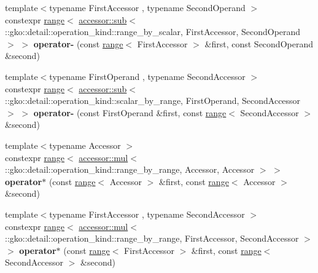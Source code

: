 \begin{DoxyCompactItemize}
\item 
\mbox{\label{namespacegko_a4d778fb0a4dd79be3297adea7a8b4e31}} 
{\footnotesize template$<$typename First\+Accessor , typename Second\+Operand $>$ }\\constexpr \hyperlink{classgko_1_1range}{range}$<$ \hyperlink{structgko_1_1accessor_1_1sub}{accessor\+::sub}$<$ \+::gko\+::detail\+::operation\+\_\+kind\+::range\+\_\+by\+\_\+scalar, First\+Accessor, Second\+Operand $>$ $>$ {\bfseries operator-\/} (const \hyperlink{classgko_1_1range}{range}$<$ First\+Accessor $>$ \&first, const Second\+Operand \&second)
\item 
\mbox{\label{namespacegko_a5d0e9697a7f202cdfef1016e535e2568}} 
{\footnotesize template$<$typename First\+Operand , typename Second\+Accessor $>$ }\\constexpr \hyperlink{classgko_1_1range}{range}$<$ \hyperlink{structgko_1_1accessor_1_1sub}{accessor\+::sub}$<$ \+::gko\+::detail\+::operation\+\_\+kind\+::scalar\+\_\+by\+\_\+range, First\+Operand, Second\+Accessor $>$ $>$ {\bfseries operator-\/} (const First\+Operand \&first, const \hyperlink{classgko_1_1range}{range}$<$ Second\+Accessor $>$ \&second)
\item 
\mbox{\label{namespacegko_a2723c0333fc2349178c8bd33a13d72b8}} 
{\footnotesize template$<$typename Accessor $>$ }\\constexpr \hyperlink{classgko_1_1range}{range}$<$ \hyperlink{structgko_1_1accessor_1_1mul}{accessor\+::mul}$<$ \+::gko\+::detail\+::operation\+\_\+kind\+::range\+\_\+by\+\_\+range, Accessor, Accessor $>$ $>$ {\bfseries operator$\ast$} (const \hyperlink{classgko_1_1range}{range}$<$ Accessor $>$ \&first, const \hyperlink{classgko_1_1range}{range}$<$ Accessor $>$ \&second)
\item 
\mbox{\label{namespacegko_a86b3c1ce84d54e93c170a0a993434349}} 
{\footnotesize template$<$typename First\+Accessor , typename Second\+Accessor $>$ }\\constexpr \hyperlink{classgko_1_1range}{range}$<$ \hyperlink{structgko_1_1accessor_1_1mul}{accessor\+::mul}$<$ \+::gko\+::detail\+::operation\+\_\+kind\+::range\+\_\+by\+\_\+range, First\+Accessor, Second\+Accessor $>$ $>$ {\bfseries operator$\ast$} (const \hyperlink{classgko_1_1range}{range}$<$ First\+Accessor $>$ \&first, const \hyperlink{classgko_1_1range}{range}$<$ Second\+Accessor $>$ \&second)

\end{DoxyCompactItemize}

